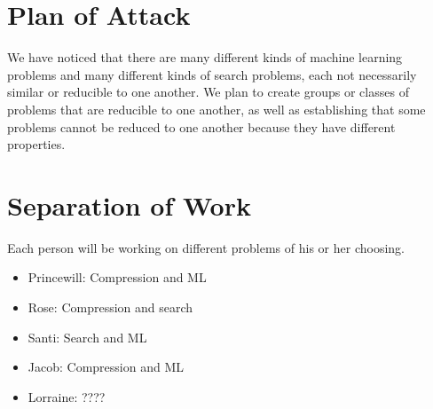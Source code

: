\documentclass[12pt]{article}
\begin{document}
\section{Plan of Attack}

We have noticed that there are many different kinds of machine learning problems and many different 
kinds of search problems, each not necessarily similar or reducible to one another.
We plan to create groups or classes of problems that are reducible to one another,
as well as establishing that some problems cannot be reduced to one another because 
they have different properties.
\section{Separation of Work}

Each person will be working on different problems of his or her choosing.

\begin{itemize}
\item
Princewill: Compression and ML
\item
Rose: Compression and search
\item
Santi: Search and ML
\item
Jacob: Compression and ML
\item
Lorraine: ????
\end{itemize}
\end{document}
